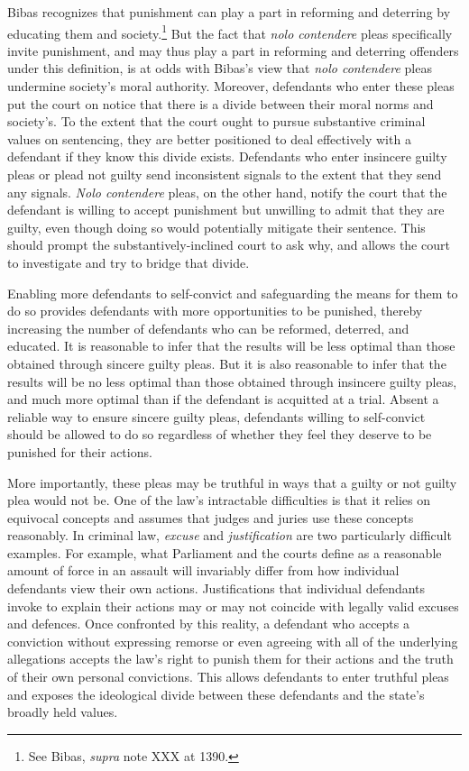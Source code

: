 Bibas recognizes that punishment can play a part in reforming and deterring by educating them and society.\footnote{See Bibas, \textit{supra} note XXX at 1390.} But the fact that \textit{nolo contendere} pleas specifically invite punishment, and may thus play a part in reforming and deterring offenders under this definition, is at odds with Bibas's view that \textit{nolo contendere} pleas undermine society's moral authority. Moreover, defendants who enter these pleas put the court on notice that there is a divide between their moral norms and society's. To the extent that the court ought to pursue substantive criminal values on sentencing, they are better positioned to deal effectively with a defendant if they know this divide exists. Defendants who enter insincere guilty pleas or plead not guilty send inconsistent signals to the extent that they send any signals. \textit{Nolo contendere} pleas, on the other hand, notify the court that the defendant is willing to accept punishment but unwilling to admit that they are guilty, even though doing so would potentially mitigate their sentence. This should prompt the substantively-inclined court to ask why, and allows the court to investigate and try to bridge that divide.

Enabling more defendants to self-convict and safeguarding the means for them to do so provides defendants with more opportunities to be punished, thereby increasing the number of defendants who can be reformed, deterred, and educated. It is reasonable to infer that the results will be less optimal than those obtained through sincere guilty pleas. But it is also reasonable to infer that the results will be no less optimal than those obtained through insincere guilty pleas, and much more optimal than if the defendant is acquitted at a trial. Absent a reliable way to ensure sincere guilty pleas, defendants willing to self-convict should be allowed to do so regardless of whether they feel they deserve to be punished for their actions.


More importantly, these pleas may be truthful in ways that a guilty or not guilty plea would not be. One of the law's intractable difficulties is that it relies on equivocal concepts and assumes that judges and juries use these concepts reasonably. In criminal law, \textit{excuse} and \textit{justification} are two particularly difficult examples. For example, what Parliament and the courts define as a reasonable amount of force in an assault will invariably differ from how individual defendants view their own actions. Justifications that individual defendants invoke to explain their actions may or may not coincide with legally valid excuses and defences. Once confronted by this reality, a defendant who accepts a conviction without expressing remorse or even agreeing with all of the underlying allegations accepts the law's right to punish them for their actions and the truth of their own personal convictions. This allows defendants to enter truthful pleas and exposes the ideological divide between these defendants and the state's broadly held values.

